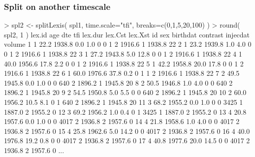 \begin{frame}[fragile]
  \frametitle{Split on another timescale}
\vspace*{-1em}
\footnotesize
\renewcommand{\baselinestretch}{0.9}
\begin{semiverbatim}
> spl2 <- splitLexis( spl1, time.scale="tfi", breaks=c(0,1,5,20,100) )
> round( spl2, 1 )
   lex.id  age    dte  tfi lex.dur lex.Cst lex.Xst   id sex birthdat contrast injecdat volume
\alert<2>{1       1 22.2 1938.8  0.0     1.0       0       0    1   2   1916.6        1   1938.8     22}
\alert<2,4>{2       1 23.2 1939.8  1.0     4.0       0       0    1   2   1916.6        1   1938.8     22}
\alert<2,4>{3       1 27.2 1943.8  5.0    12.8       0       0    1   2   1916.6        1   1938.8     22}
\alert<2,3>{4       1 40.0 1956.6 17.8     2.2       0       0    1   2   1916.6        1   1938.8     22}
\alert<2,4>{5       1 42.2 1958.8 20.0    17.8       0       0    1   2   1916.6        1   1938.8     22}
\alert<2,3>{6       1 60.0 1976.6 37.8     0.2       0       1    1   2   1916.6        1   1938.8     22}
\alert<5>{7       2 49.5 1945.8  0.0     1.0       0       0  640   2   1896.2        1   1945.8     20}
\alert<5>{8       2 50.5 1946.8  1.0     4.0       0       0  640   2   1896.2        1   1945.8     20}
\alert<5>{9       2 54.5 1950.8  5.0     5.5       0       0  640   2   1896.2        1   1945.8     20}
\alert<5>{10      2 60.0 1956.2 10.5     8.1       0       1  640   2   1896.2        1   1945.8     20}
\alert<6>{11      3 68.2 1955.2  0.0     1.0       0       0 3425   1   1887.0        2   1955.2      0}
\alert<6>{12      3 69.2 1956.2  1.0     0.4       0       1 3425   1   1887.0        2   1955.2      0}
\alert<7>{13      4 20.8 1957.6  0.0     1.0       0       0 4017   2   1936.8        2   1957.6      0}
\alert<7>{14      4 21.8 1958.6  1.0     4.0       0       0 4017   2   1936.8        2   1957.6      0}
\alert<7>{15      4 25.8 1962.6  5.0    14.2       0       0 4017   2   1936.8        2   1957.6      0}
\alert<7>{16      4 40.0 1976.8 19.2     0.8       0       0 4017   2   1936.8        2   1957.6      0}
\alert<7>{17      4 40.8 1977.6 20.0    14.5       0       0 4017   2   1936.8        2   1957.6      0}
...
\end{semiverbatim}
\end{frame}

